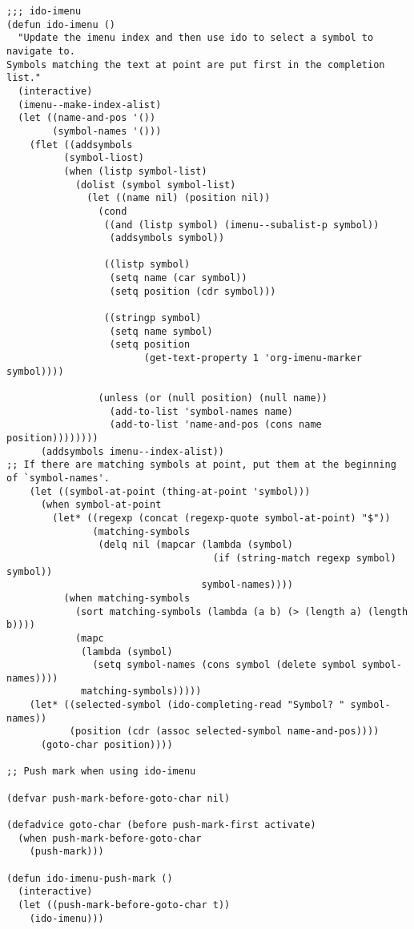 \documentclass[nofonts]{tufte-handout}
\begin{document}
\begin{verbatim}
;;; ido-imenu
(defun ido-imenu ()
  "Update the imenu index and then use ido to select a symbol to navigate to.
Symbols matching the text at point are put first in the completion list."
  (interactive)
  (imenu--make-index-alist)
  (let ((name-and-pos '())
        (symbol-names '()))
    (flet ((addsymbols
          (symbol-liost)
          (when (listp symbol-list)
            (dolist (symbol symbol-list)
              (let ((name nil) (position nil))
                (cond
                 ((and (listp symbol) (imenu--subalist-p symbol))
                  (addsymbols symbol))

                 ((listp symbol)
                  (setq name (car symbol))
                  (setq position (cdr symbol)))

                 ((stringp symbol)
                  (setq name symbol)
                  (setq position
                        (get-text-property 1 'org-imenu-marker symbol))))

                (unless (or (null position) (null name))
                  (add-to-list 'symbol-names name)
                  (add-to-list 'name-and-pos (cons name position))))))))
      (addsymbols imenu--index-alist))
;; If there are matching symbols at point, put them at the beginning of `symbol-names'.
    (let ((symbol-at-point (thing-at-point 'symbol)))
      (when symbol-at-point
        (let* ((regexp (concat (regexp-quote symbol-at-point) "$"))
               (matching-symbols
                (delq nil (mapcar (lambda (symbol)
                                    (if (string-match regexp symbol) symbol))
                                  symbol-names))))
          (when matching-symbols
            (sort matching-symbols (lambda (a b) (> (length a) (length b))))
            (mapc
             (lambda (symbol)
               (setq symbol-names (cons symbol (delete symbol symbol-names))))
             matching-symbols)))))
    (let* ((selected-symbol (ido-completing-read "Symbol? " symbol-names))
           (position (cdr (assoc selected-symbol name-and-pos))))
      (goto-char position))))

;; Push mark when using ido-imenu

(defvar push-mark-before-goto-char nil)

(defadvice goto-char (before push-mark-first activate)
  (when push-mark-before-goto-char
    (push-mark)))

(defun ido-imenu-push-mark ()
  (interactive)
  (let ((push-mark-before-goto-char t))
    (ido-imenu)))
\end{verbatim}
\end{document}
